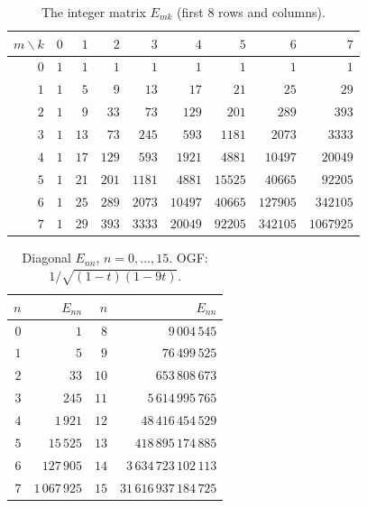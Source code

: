 \documentclass[11pt,a4paper]{article}
\theoremstyle{definition}
\theoremstyle{plain}
\begin{document}
\begin{table}[ht]
\centering
\caption{The integer matrix $E_{mk}$ (first 8 rows and columns).}
\label{tab:Emk}
\small
\begin{tabular}{r|rrrrrrrr}
\toprule
$m\backslash k$ & $0$ & $1$ & $2$ & $3$ & $4$ & $5$ & $6$ & $7$ \\
\midrule
$0$ & $1$ & $1$ & $1$ & $1$ & $1$ & $1$ & $1$ & $1$ \\
$1$ & $1$ & $5$ & $9$ & $13$ & $17$ & $21$ & $25$ & $29$ \\
$2$ & $1$ & $9$ & $33$ & $73$ & $129$ & $201$ & $289$ & $393$ \\
$3$ & $1$ & $13$ & $73$ & $245$ & $593$ & $1181$ & $2073$ & $3333$ \\
$4$ & $1$ & $17$ & $129$ & $593$ & $1921$ & $4881$ & $10497$ & $20049$ \\
$5$ & $1$ & $21$ & $201$ & $1181$ & $4881$ & $15525$ & $40665$ & $92205$ \\
$6$ & $1$ & $25$ & $289$ & $2073$ & $10497$ & $40665$ & $127905$ & $342105$ \\
$7$ & $1$ & $29$ & $393$ & $3333$ & $20049$ & $92205$ & $342105$ & $1067925$ \\
\bottomrule
\end{tabular}
\end{table}

\begin{table}[ht]
\centering
\caption{Diagonal $E_{nn}$, $n=0,\ldots,15$.
OGF: $1/\sqrt{(1-t)(1-9t)}$.}
\label{tab:diag}
\small
\begin{tabular}{r|r||r|r}
\toprule
$n$ & $E_{nn}$ & $n$ & $E_{nn}$ \\
\midrule
$0$ & $1$ & $8$ & $9\,004\,545$ \\
$1$ & $5$ & $9$ & $76\,499\,525$ \\
$2$ & $33$ & $10$ & $653\,808\,673$ \\
$3$ & $245$ & $11$ & $5\,614\,995\,765$ \\
$4$ & $1\,921$ & $12$ & $48\,416\,454\,529$ \\
$5$ & $15\,525$ & $13$ & $418\,895\,174\,885$ \\
$6$ & $127\,905$ & $14$ & $3\,634\,723\,102\,113$ \\
$7$ & $1\,067\,925$ & $15$ & $31\,616\,937\,184\,725$ \\
\bottomrule
\end{tabular}
\end{table}
\end{document}
